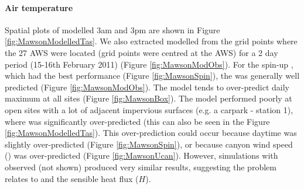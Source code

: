 \documentclass[final,3p,times,authoryear]{elsarticle}
\begin{document}
\paragraph{Air temperature}\label{sec:airtempresult} 


Spatial plots of modelled 3am and 3pm  are shown in Figure \ref{fig:MawsonModelledTas}. We also extracted modelled  from the grid points where the 27 AWS were located (grid points were centred at the AWS) for a 2 day period (15-16th February 2011) (Figure \ref{fig:MawsonModObs}). For the spin-up , which had the best  performance (Figure \ref{fig:MawsonSpin}), the  was generally well predicted (Figure \ref{fig:MawsonModObs}).  The model tends to over-predict daily maximum  at all sites (Figure \ref{fig:MawsonBox}).  The model performed poorly at open sites with a lot of adjacent impervious surfaces (e.g. a carpark - station 1), where  was significantly over-predicted (this can also be seen in the Figure \ref{fig:MawsonModelledTas}).  This over-prediction could occur because daytime  was slightly over-predicted (Figure \ref{fig:MawsonSpin}), or because canyon wind speed () was over-predicted (Figure \ref{fig:MawsonUcan}). However, simulations with observed  (not shown) produced very similar  results, suggesting the problem relates to  and the sensible heat flux ($H$).  
\end{document}
